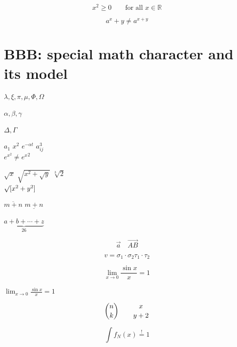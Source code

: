 \documentclass{article}
\begin{document}
\begin{displaymath}
x^{2} \geq 0\qquad
\textrm{for all }x\in\mathbb{R}
\end{displaymath}


\begin{equation}
a^x+y \neq a^{x+y}
\end{equation}


\section{BBB: special math character and its model}

$\lambda,\xi,\pi,\mu,\Phi,\Omega$

$\alpha, \beta, \gamma$

$\Delta, \Gamma$

$a_{1}$ \qquad $x^{2}$ \qquad
$e^{-\alpha t}$ \qquad
$a^{3}_{ij}$\\
$e^{x^2} \neq {e^x}^2$

$\sqrt{x}$ \qquad
$\sqrt{ x^{2}+\sqrt{y} }$
\qquad $\sqrt[3]{2}$\\[3pt]
$\surd[x^2 + y^2]$

$\overline{m+n}$ \qquad
$\underline{m+n}$

$\underbrace{ a+b+\cdots+z }_{26}$

\begin{displaymath}
\vec a\quad\overrightarrow{AB}
\end{displaymath}

\begin{displaymath}
v = {\sigma}_1 \cdot {\sigma}_2
{\tau}_1 \cdot {\tau}_2
\end{displaymath}

\[\lim_{x \rightarrow 0}
\frac{\sin x}{x}=1\] %


$\lim_{x \rightarrow 0} 
\frac{\sin x}{x}=1$  %

\begin{displaymath}
{n \choose k}\qquad {x \atop y+2}
\end{displaymath}

\begin{displaymath}
\int f_N(x) \stackrel{!}{=} 1
\end{displaymath}
\end{document}

